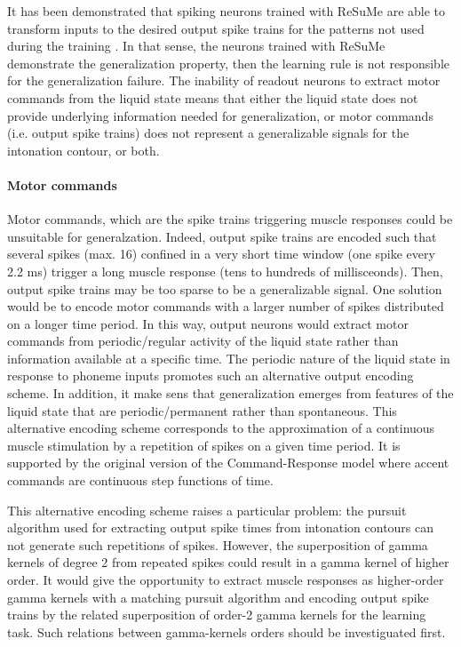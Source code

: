 \documentclass[11pt, a4paper]{article} %
\begin{document}
It has been demonstrated that spiking neurons trained with ReSuMe are able to transform inputs to the desired output spike trains for the patterns not used during the training \cite{ponulak2006generalization}. In that sense, the neurons trained with ReSuMe demonstrate the generalization property, then the learning rule is not responsible for the generalization failure. The inability of readout neurons to extract motor commands from the liquid state means that either the liquid state does not provide underlying information needed for generalization, or motor commands (i.e. output spike trains) does not represent a generalizable signals for the intonation contour, or both.

\paragraph{Motor commands}
Motor commands, which are the spike trains triggering muscle responses could be unsuitable for generalzation. Indeed, output spike trains are encoded such that several spikes (max. 16) confined in a very short time window (one spike every 2.2 ms) trigger a long muscle response (tens to hundreds of millisceonds). Then, output spike trains may be too sparse to be a generalizable signal. One solution would be to encode motor commands with a larger number of spikes distributed on a longer time period. In this way, output neurons would extract motor commands from periodic/regular activity of the liquid state rather than information available at a specific time. The periodic nature of the liquid state in response to phoneme inputs promotes such an alternative output encoding scheme. In addition, it make sens that generalization emerges from features of the liquid state that are periodic/permanent rather than spontaneous. This alternative encoding scheme corresponds to the approximation of a continuous muscle stimulation by a repetition of spikes on a given time period. It is supported by the original version of the Command-Response model \cite{ohno1998effects} where accent commands are continuous step functions of time.

This alternative encoding scheme raises a particular problem: the pursuit algorithm used for extracting output spike times from intonation contours can not generate such repetitions of spikes. However, the superposition of gamma kernels of degree 2 from repeated spikes could result in a gamma kernel of higher order. It would give the opportunity to extract muscle responses as higher-order gamma kernels with a matching pursuit algorithm and encoding output spike trains by the related superposition of order-2 gamma kernels for the learning task. Such relations between gamma-kernels orders should be investiguated first.
\end{document}
